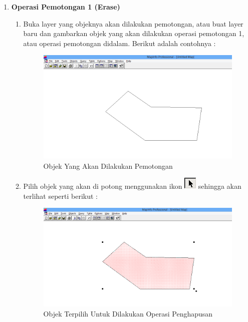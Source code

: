 \begin{enumerate}[\bfseries A.]
  \item \textbf{Operasi Pemotongan 1 (Erase)}
  
  \begin{enumerate}[1.]
    \item Buka layer yang objeknya akan dilakukan pemotongan, atau buat layer baru dan gambarkan objek yang akan dilakukan operasi pemotongan 1, atau operasi pemotongan didalam. Berikut adalah contohnya :
    
    \begin{figure}[H]
      \centering
      \includegraphics[width=1\textwidth]{./resources/024-layer-untuk-erase}
      \caption{Objek Yang Akan Dilakukan Pemotongan}
    \end{figure}  
  
    \item Pilih objek yang akan di potong menggunakan ikon \includegraphics{./resources/008-ikon-select} sehingga akan terlihat seperti berikut :
    
    \begin{figure}[H]
      \centering
      \includegraphics[width=1\textwidth]{./resources/025-objek-terpilih-untuk-erase}
      \caption{Objek Terpilih Untuk Dilakukan Operasi Penghapusan}
    \end{figure}
    

\end{enumerate}
\end{enumerate}
